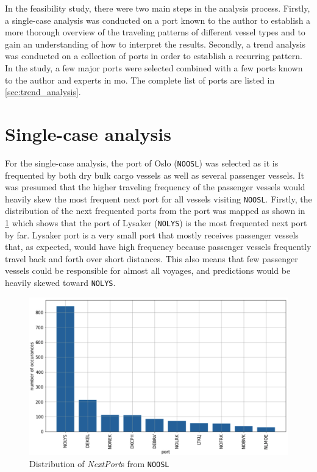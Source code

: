 In the feasibility study, there were two main steps in the analysis process. Firstly, a single-case analysis was conducted on a port known to the author to establish a more thorough overview of the traveling patterns of different vessel types and to gain an understanding of how to interpret the results. Secondly, a trend analysis was conducted on a collection of ports in order to establish a recurring pattern. In the study, a few major ports were selected combined with a few ports known to the author and experts in \acrshort{mo}. The complete list of ports are listed in \cref{sec:trend_analysis}.

\section{Single-case analysis}

For the single-case analysis, the port of Oslo (\texttt{NOOSL}) was selected as it is frequented by both dry bulk cargo vessels as well as several passenger vessels. It was presumed that the higher traveling frequency of the passenger vessels would heavily skew the most frequent next port for all vessels visiting \texttt{NOOSL}. Firstly, the distribution of the next frequented ports from the port was mapped as shown in \cref{fig:apw_noosl_freq} which shows that the port of Lysaker (\texttt{NOLYS}) is the most frequented next port by far. Lysaker port is a very small port that mostly receives passenger vessels that, as expected, would have high frequency because passenger vessels frequently travel back and forth over short distances. This also means that few passenger vessels could be responsible for almost all voyages, and predictions would be heavily skewed toward \texttt{NOLYS}.

\begin{figure}[htbp]
    \centering
    \includegraphics[width=.9\textwidth]{figures/apw/noosl_freq.png}
    \caption{Distribution of \textit{NextPort}s from \texttt{NOOSL}}
    \label{fig:apw_noosl_freq}
\end{figure}

